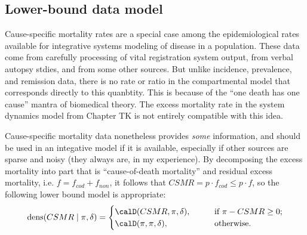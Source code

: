 \subsection{Lower-bound data model}
Cause-specific mortality rates are a special case among the
epidemiological rates available for integrative systems modeling of
disease in a population.  These data come from carefully processing of
vital registration system output, from verbal autopsy stdies, and from
some other sources. But unlike incidence, prevalence, and remission
data, there is no rate or ratio in the compartmental model that
corresponds directly to this quanbtity.  This is because of the ``one
death has one cause'' mantra of biomedical theory.  The excess
mortality rate in the system dynamics model from Chapter TK is not
entirely compatible with this idea.

Cause-specific mortality data nonetheless provides \emph{some}
information, and should be used in an integative model if it is
available, especially if other sources are sparse and noisy (they
always are, in my experience).  By decomposing the excess mortality
into part that is ``cause-of-death mortality'' and residual excess
mortality, i.e. $f = f_{cod} + f_{non}$, it follows that $CSMR =p
\cdot f_{cod} \leq p\cdot f$, so the following lower bound model is
appropriate:
\[
\dens(CSMR \given \pi,\delta)
=
\begin{cases}
\calD(CSMR, \pi, \delta), &\qquad\text{if } \pi-CSMR \geq 0;\\
\calD(\pi, \pi, \delta), &\qquad\text{otherwise.}
\end{cases}
\]

